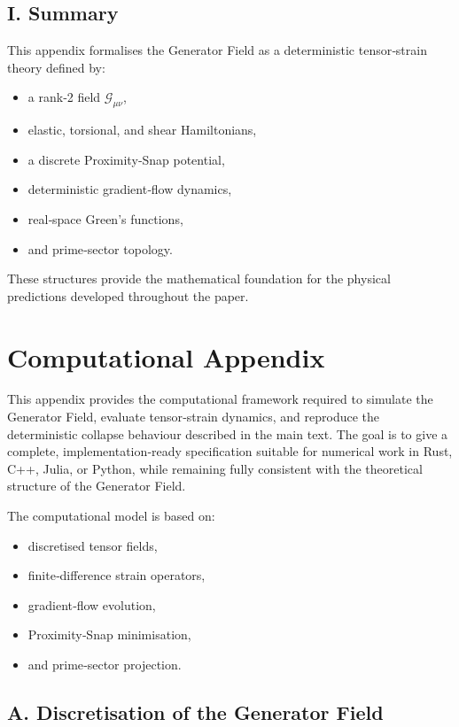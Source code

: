 \documentclass[reprint,amsmath,amssymb,aps,prl,floatfix]{revtex4-2}
\begin{document}
\begin{itemize}
\subsection{I. Summary}

This appendix formalises the Generator Field as a deterministic tensor‑strain theory defined by:

\begin{itemize}
\item a rank‑2 field \(\mathcal{G}_{\mu\nu}\),  
\item elastic, torsional, and shear Hamiltonians,  
\item a discrete Proximity‑Snap potential,  
\item deterministic gradient‑flow dynamics,  
\item real‑space Green’s functions,  
\item and prime‑sector topology.
\end{itemize}

These structures provide the mathematical foundation for the physical predictions developed throughout the paper.

\section{Computational Appendix}

This appendix provides the computational framework required to simulate the Generator Field, evaluate tensor‑strain dynamics, and reproduce the deterministic collapse behaviour described in the main text. The goal is to give a complete, implementation‑ready specification suitable for numerical work in Rust, C++, Julia, or Python, while remaining fully consistent with the theoretical structure of the Generator Field.
\medskip

The computational model is based on:
\begin{itemize}
\item discretised tensor fields,  
\item finite‑difference strain operators,  
\item gradient‑flow evolution,  
\item Proximity‑Snap minimisation,  
\item and prime‑sector projection.
\end{itemize}

\subsection{A. Discretisation of the Generator Field}


\end{itemize}
\end{document}
